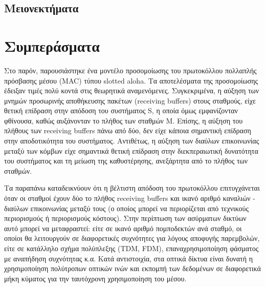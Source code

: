 \documentclass[12pt]{report}
\begin{document}
\subsection{Μειονεκτήματα}



\section{Συμπεράσματα}
Στο παρόν, παρουσιάστηκε ένα μοντέλο προσομοίωσης του πρωτοκόλλου πολλαπλής πρόσβασης μέσου (\textlatin{MAC}) τύπου \textlatin{slotted aloha}. Τα αποτελέσματα της προσομοίωσης έδειξαν τιμές πολύ κοντά στις θεωρητικά αναμενόμενες. Συγκεκριμένα, η αύξηση των μνημών προσωρινής αποθήκευσης πακέτων (\textlatin{receiving buffers}) στους σταθμούς, είχε θετική επίδραση στην απόδοση του συστήματος \textlatin{S}, η οποία όμως εμφανίζονταν φθίνουσα, καθώς αυξάνονταν το πλήθος των σταθμών \textlatin{M}. Επίσης, η αύξηση του πλήθους των \textlatin{receiving buffers} πάνω από δύο, δεν είχε κάποια σημαντική επίδραση στην αποδοτικότητα του συστήματος. Αντιθέτως, η αύξηση των διαύλων επικοινωνίας μεταξύ των κόμβων είχε σημαντικά θετική επίδραση στην διεκπεραιωτική δυνατότητα του συστήματος και τη μείωση της καθυστέρησης, ανεξάρτητα από το πλήθος των σταθμών.

Τα παραπάνω καταδεικνύουν ότι η βέλτιστη απόδοση του πρωτοκόλλου επιτυγχάνεται όταν οι σταθμοί έχουν δύο το πλήθος \textlatin{receiving buffers} και ικανό αριθμό καναλιών - διαύλων επικοινωνίας μεταξύ τους (ο οποίος μπορεί να περιορίζεται από τεχνικούς περιορισμούς ή περιορισμούς κόστους). Στην περίπτωση των ασύρματων δικτύων αυτό μπορεί να μεταφραστεί: είτε σε ικανό αριθμό πομποδεκτών ανά σταθμό, οι οποίοι θα λειτουργούν σε διαφορετικές συχνότητες για λόγους αποφυγής παρεμβολών, είτε σε κατάλληλο σχήμα πολύπλεξης (\textlatin{TDM, FDM}), επαναχρησιμοποίηση φάσματος με αναπήδηση συχνότητας κ.α. Κατά αντιστοιχία, στα οπτικά δίκτυα είναι δυνατή η χρησιμοποίηση πολύτροπων οπτικών ινών και εκπομπή των δεδομένων σε διαφορετικά μήκη κύματος για την ταυτόχρονη χρησιμοποίηση του μέσου.

\begin{appendices}

\end{appendices}

\appendix



\end{document}
